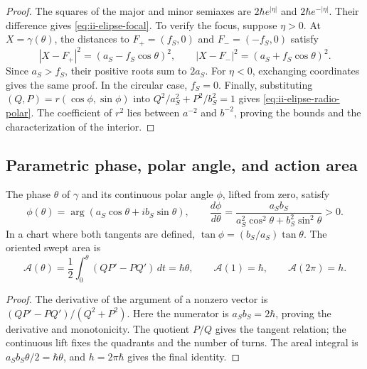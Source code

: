 \begin{proof}
The squares of the major and minor semiaxes are
\(2\hbar e^{|\eta|}\) and \(2\hbar e^{-|\eta|}\). Their difference
gives \eqref{eq:ii-elipse-focal}. To verify the focus, suppose
\(\eta>0\). At \(X=\gamma(\theta)\), the distances to
\(F_+=(f_S,0)\) and \(F_-=(-f_S,0)\) satisfy
\[
 |X-F_+|^2=(a_S-f_S\cos\theta)^2,\qquad
 |X-F_-|^2=(a_S+f_S\cos\theta)^2.
\]
Since \(a_S>f_S\), their positive roots sum to \(2a_S\).
For \(\eta<0\), exchanging coordinates gives the same proof.
In the circular case, \(f_S=0\). Finally, substituting
\((Q,P)=r(\cos\phi,\sin\phi)\) into
\(Q^2/a_S^2+P^2/b_S^2=1\) gives
\eqref{eq:ii-elipse-radio-polar}. The coefficient of \(r^2\) lies
between \(a^{-2}\) and \(b^{-2}\), proving the bounds and the
characterization of the interior.
\end{proof}

\subsection{Parametric phase, polar angle, and action area}
\label{sec:ii-elipse-fase-area}

\begin{proposition}
\label{prop:ii-elipse-area}
The phase \(\theta\) of \(\gamma\) and its continuous polar angle
\(\phi\), lifted from zero, satisfy
\begin{equation}
 \phi(\theta)=\arg(a_S\cos\theta+i b_S\sin\theta),\qquad
 \frac{d\phi}{d\theta}
 =\frac{a_Sb_S}{a_S^2\cos^2\theta+b_S^2\sin^2\theta}>0.
 \label{eq:ii-elipse-fases}
\end{equation}
In a chart where both tangents are defined,
\(\tan\phi=(b_S/a_S)\tan\theta\). The oriented swept area is
\begin{equation}
 \mathcal A(\theta)=\frac12\int_0^\theta(QP'-PQ')\,dt
 =\hbar\theta,\qquad
 \mathcal A(1)=\hbar,\qquad \mathcal A(2\pi)=h.
 \label{eq:ii-elipse-area-fase}
\end{equation}
\end{proposition}

\begin{proof}
The derivative of the argument of a nonzero vector is
\((QP'-PQ')/(Q^2+P^2)\). Here the numerator is
\(a_Sb_S=2\hbar\), proving the derivative and monotonicity.
The quotient \(P/Q\) gives the tangent relation; the continuous
lift fixes the quadrants and the number of turns. The areal integral
is \(a_Sb_S\theta/2=\hbar\theta\), and
\(h=2\pi\hbar\) gives the final identity.
\end{proof}

